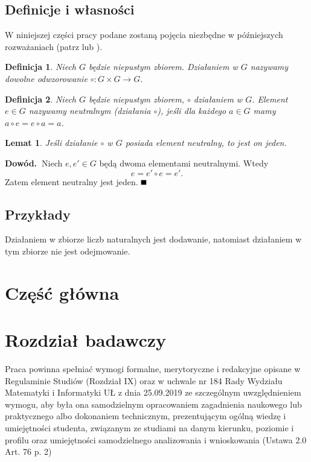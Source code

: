 \documentclass[magisterska]{pracadypl}
\def\pd{\noindent \textbf{Dowód.~}} %
\def\kd{\hfill\mbox{$\rule{2mm}{2mm}$}} %
\newtheorem{defi}{Definicja}[section]
\newtheorem{lem}{Lemat}[section]
\begin{document}
\section{Definicje i własności}

W niniejszej części pracy podane zostaną pojęcia niezbędne w późniejszych rozważaniach (patrz \cite{Kostrykin} lub \cite{Lang}).
\begin{defi}
Niech $G$ będzie niepustym zbiorem. Działaniem w $G$ nazywamy dowolne odwzorowanie $\circ:G\times G\to G$.
\end{defi}

\begin{defi}
Niech $G$ będzie niepustym zbiorem, $\circ$ działaniem w $G$. Element $e\in G$ nazywamy neutralnym (działania $\circ$), jeśli dla każdego $a\in G$ mamy $a\circ e=e\circ a=a$.
\end{defi}

\begin{lem}\label{lem:element_neutralny}
Jeśli działanie $\circ$ w $G$ posiada element neutralny, to jest on jeden.
\end{lem}
\pd Niech $e,e'\in G$ będą dwoma elementami neutralnymi. Wtedy
\begin{equation}\label{eq:element_neutralny}
e=e'\circ e=e'.
\end{equation}
Zatem element neutralny jest jeden. \kd


\section{Przykłady}

Działaniem w zbiorze liczb naturalnych jest dodawanie, natomiast działaniem w tym zbiorze nie jest odejmowanie.




\chapter{Część główna}




\chapter{Rozdział badawczy}

Praca powinna spełniać wymogi formalne, merytoryczne i redakcyjne opisane w Regulaminie  Studiów (Rozdział IX) oraz w uchwale nr 184 Rady Wydziału Matematyki i Informatyki UŁ z dnia 25.09.2019 ze szczególnym uwzględnieniem wymogu, aby była ona samodzielnym opracowaniem zagadnienia naukowego lub praktycznego albo dokonaniem technicznym, prezentującym ogólną wiedzę i umiejętności studenta, związanym ze studiami na danym kierunku, poziomie i profilu oraz umiejętności samodzielnego analizowania i wnioskowania (Ustawa 2.0 Art. 76 p. 2)
\end{document}
